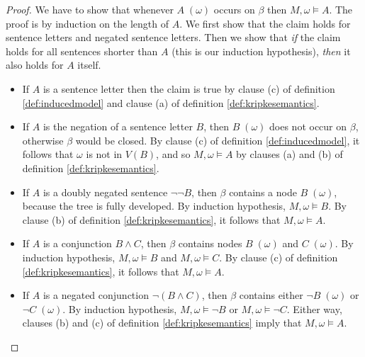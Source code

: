 \begin{proof}
  We have to show that whenever $A\; (\omega)$ occurs on $\beta$ then
  $M,\omega \models A$. The proof is by induction on the length of $A$. We first
  show that the claim holds for sentence letters and negated sentence letters.
  Then we show that \emph{if} the claim holds for all sentences shorter than $A$
  (this is our induction hypothesis), \emph{then} it also holds for $A$ itself.
  
  \begin{itemize}
    
    \item If $A$ is a sentence letter then the claim is true by clause (c) of
          definition \ref{def:inducedmodel} and clause (a) of definition
          \ref{def:kripkesemantics}.

    \item If $A$ is the negation of a sentence letter $B$, then $B\; (\omega)$
          does not occur on $\beta$, otherwise $\beta$ would be closed. By
          clause (c) of definition \ref{def:inducedmodel}, it follows that
          $\omega$ is not in $V(B)$, and so $M, \omega \models A$ by clauses (a)
          and (b) of definition \ref{def:kripkesemantics}.
          
    \item If $A$ is a doubly negated sentence $\neg\neg B$, then $\beta$
          contains a node $B \;(\omega)$, because the tree is fully developed.
          By induction hypothesis, $M,\omega \models B$. By clause (b) of
          definition \ref{def:kripkesemantics}, it follows that
          $M,\omega \models A$.
    
    \item If $A$ is a conjunction $B\land C$, then $\beta$ contains nodes
          $B \;(\omega)$ and $C \;(\omega)$. By induction hypothesis,
          $M,\omega \models B$ and $M,\omega \models C$. By clause (c) of
          definition \ref{def:kripkesemantics}, it follows that
          $M,\omega \models A$.

    \item If $A$ is a negated conjunction $\neg(B\land C)$, then $\beta$ contains
          either $\neg B \;(\omega)$ or $\neg C \;(\omega)$. By induction
          hypothesis, $M,\omega \models \neg B$ or $M,\omega \models \neg C$.
          Either way, clauses (b) and (c) of definition
          \ref{def:kripkesemantics} imply that $M,\omega \models A$.
    
    

\end{itemize}
\end{proof}

